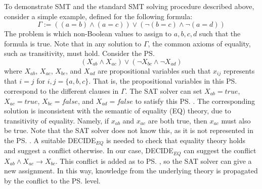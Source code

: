 To demonstrate SMT and the standard SMT solving procedure described above, consider a simple example, defined for the following formula:
\begin{equation}
\Gamma := ((a = b) \wedge (a=c)) \vee (\neg(b = c) \wedge \neg(a=d))
\end{equation}
The problem is which non-Boolean values to assign to $a,b,c,d$ such that the formula is true. 
Note that in any solution to $\Gamma$, the common axioms of equality, such as transitivity, must hold. 
Consider the \ps  
\begin{equation}
 (X_{ab} \wedge X_{ac}) \vee (\neg X_{bc} \wedge \neg X_{ad})   
\end{equation}
where $X_{ab}$, $X_{ac}$, $X_{bc}$, and $X_{ad}$ are propositional variables such that $x_{ij}$ represents that $i=j$ for $i,j=\{a,b,c\}$. 
That is, the propositional variables in this \ps correspond to the different clauses in $\Gamma$. 
The SAT solver can set $X_{ab}=true$, $X_{ac}=true$, $X_{bc}=false$, and $X_{ad}=false$ to satisfy this \ps. %
The corresponding solution is inconsistent with the semantic of equality (EQ) theory, due to transitivity of equality. Namely, if $x_{ab}$ and $x_{ac}$ are both true, then $x_{ac}$ must also be true. Note that the SAT solver does not know this, as it is not represented in the \ps. A suitable DECIDE$_{EQ}$ is needed to check that equality theory holds and suggest a conflict otherwise. In our case, DECIDE$_{EQ}$ can suggest the conflict $X_{ab} \wedge X_{ac} \rightarrow X_{bc}$. This conflict is added as to \ps, so the SAT solver can give a new assignment. %
In this way, knowledge from the underlying theory is propagated by the conflict to the \ps level.

